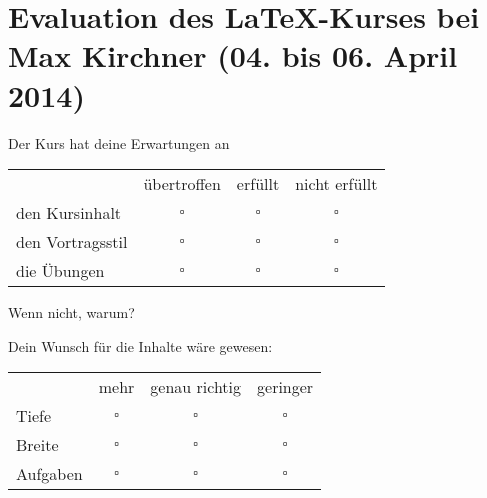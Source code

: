 
\usepackage{tikz}
\usepackage{wrapfig}
\usepackage{eurosym}

\hypersetup{
	pdftitle=
}

\title{}
\author{
	Martin Ueding \\
	\small{\href{mailto:mu@martin-ueding.de}{mu@martin-ueding.de}}
}

\pagestyle{empty}

\newcommand{\vorname}{Max}
\newcommand{\nachname}{Kirchner}
\newcommand{\datum}{04. bis 06. April 2014}

\newcommand{\sep}{\vspace{0.5cm}}




	\section*{
	Evaluation des \LaTeX{}-Kurses bei \vorname{} \nachname{} (\datum)
}

Der Kurs hat deine Erwartungen an

\begin{tabular}{lccc}
	& übertroffen & erfüllt & nicht erfüllt \\
	den Kursinhalt & $\square$ & $\square$ & $\square$ \\
	den Vortragsstil & $\square$ & $\square$ & $\square$ \\
	die Übungen      & $\square$ & $\square$ & $\square$
\end{tabular}

Wenn nicht, warum?
\hrulefill

\hrulefill

\hrulefill

\sep

Dein Wunsch für die Inhalte wäre gewesen:

\begin{tabular}{lccc}
	& mehr & genau richtig & geringer \\
	Tiefe & $\square$ & $\square$ & $\square$ \\
	Breite & $\square$ & $\square$ & $\square$ \\
        Aufgaben & $\square$ & $\square$ & $\square$
\end{tabular}

